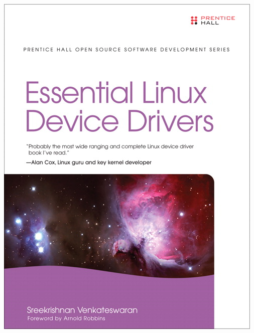 \begin{frame}
\begin{columns}
    \includegraphics[width=\textwidth]{slides/kernel-resources-references/eldd.jpg}
  \end{columns}
\end{frame}

